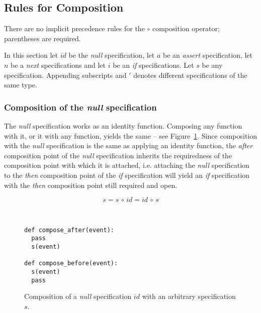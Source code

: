 \documentclass[a4paper,11pt]{kth-mag}
\begin{document}
\subsection{Rules for Composition} \label{section-approach-composition}
\lstset{language=Python,numbers=none}

There are no implicit precedence rules for the $\circ$ composition operator;
parentheses are required.

In this section let $id$ be the \textit{null} specification, let
$a$ be an
\textit{assert} specification, let $n$ be a \textit{next} specifications and
let $i$ be an \textit{if} specifications. Let $s$ be any specification.
Appending subscripts and $'$ denotes different specifications of the same type.


\subsubsection{Composition of the \textit{null} specification}

The \textit{null} specification works as an identity function. Composing any
function with it, or it with any function, yields the same -- see
Figure~\ref{figure-null-composition}. Since composition with the \textit{null}
specification is the same as applying an identity function, the \textit{after}
composition point of the \textit{null} specification inherits the requiredness
of the composition point with which it is attached, i.e. attaching the
\textit{null} specification to the \textit{then} composition point of the
\textit{if} specification will yield an \textit{if} specification with the
\textit{then} composition point still required and open.

\begin{figure}[h!]
	\begin{minipage}{0.45\textwidth}
		\centering
    \[
    s = s \, \circ \, id = id \, \circ \, s
    \]
	\end{minipage}
  ~
	\begin{minipage}{0.45\textwidth}
		\centering
	\begin{lstlisting}
def compose_after(event):
  pass
  s(event)

def compose_before(event):
  s(event)
  pass
  \end{lstlisting}
	\end{minipage}

  \caption{Composition of a \textit{null} specification $id$ with an arbitrary
    specification $s$.}
	\label{figure-null-composition}
\end{figure}
\end{document}
